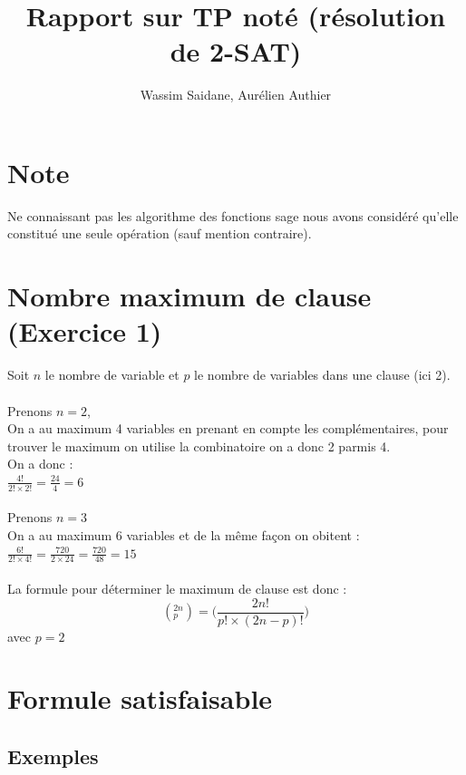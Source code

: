 \documentclass{article}
\title{Rapport sur TP noté (résolution de 2-SAT)}
\author{Wassim Saidane, Aurélien Authier}
\date{}
\begin{document}
    \maketitle
    \tableofcontents
    \newpage
    \section*{Note}
    Ne connaissant pas les algorithme des fonctions sage nous avons considéré qu'elle constitué une seule opération (sauf mention contraire).
    \section{Nombre maximum de clause (Exercice 1)}
    Soit $n$ le nombre de variable et $p$ le nombre de variables dans une clause (ici 2). \\
    \\
    Prenons $n=2$, \\
    On a au maximum 4 variables en prenant en compte les complémentaires, pour trouver le maximum on utilise la combinatoire on a donc 2 parmis 4.\\
    On a donc : \\
    $\frac{4!}{2! \times 2!}=\frac{24}{4}=6$ \\
    \\
    Prenons $n=3$ \\
    On a au maximum 6 variables et de la même façon on obitent : \\
    $\frac{6!}{2! \times 4!}=\frac{720}{2 \times 24}=\frac{720}{48}=15$ \\
    \\
    La formule pour déterminer le maximum de clause est donc : 
    \begin{equation*}
        (^{2n}_p)=\biggl(\frac{2n!}{p! \times (2n-p)!}\biggr)
    \end{equation*}
    avec $p=2$
    \section{Formule satisfaisable}
    \subsection{Exemples}
\end{document}
